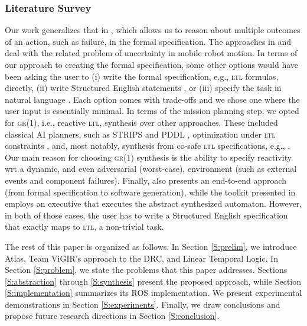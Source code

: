 \subsubsection*{Literature Survey}
Our work generalizes that in \cite{Vasu2013ICRA}, which allows us to reason about multiple outcomes of an action, such as failure, in the formal specification.
The approaches in \cite{Jon2015ICRA} and \cite{Kavraki2012ICRA} deal with the related problem of uncertainty in mobile robot motion.
In terms of our approach to creating the formal specification, some other options would have been asking the user to (i) write the formal specification, e.g., \textsc{ltl} formulas, directly, (ii) write Structured English statements \cite{JFRKG2012ICRA}, or (iii) specify the task in natural language \cite{Lignos2015AURO}.
Each option comes with trade-offs and we chose one where the user input is essentially minimal.
In terms of the mission planning step, we opted for \textsc{gr(1)}, i.e., reactive \textsc{ltl}, synthesis \cite{Bloem2012GR1} over other approaches.
These included classical AI planners, such as STRIPS \cite{STRIPS1971AI} and PDDL \cite{PDDL1998TR}, optimization under \textsc{ltl} constraints \cite{Wolff2014ICRA}, and, most notably, synthesis from co-safe \textsc{ltl} specifications, e.g., \cite{Kavraki2015ICRA}.
Our main reason for choosing \textsc{gr(1)} synthesis is the ability to specify reactivity \ac{wrt} a dynamic, and even adversarial (worst-case), environment (such as external events and component failures).
Finally, \cite{Ankur2015ISRR} also presents an end-to-end approach (from formal specification to software generation), while the toolkit presented in \cite{Finucane2010IROS} employs an executive that executes the abstract synthesized automaton.
However, in both of those cases, the user has to write a Structured English \cite{JFRKG2012ICRA} specification that exactly maps to \textsc{ltl}, a non-trivial task.

The rest of this paper is organized as follows.
In Section \ref{S:prelim}, we introduce Atlas, Team ViGIR's approach to the DRC, and Linear Temporal Logic.
In Section \ref{S:problem}, we state the problems that this paper addresses.
Sections \ref{S:abstraction} through \ref{S:synthesis} present the proposed approach, while Section \ref{S:implementation} summarizes its ROS implementation.
We present experimental demonstrations in Section \ref{S:experiments}.
Finally, we draw conclusions and propose future research directions in Section \ref{S:conclusion}.

